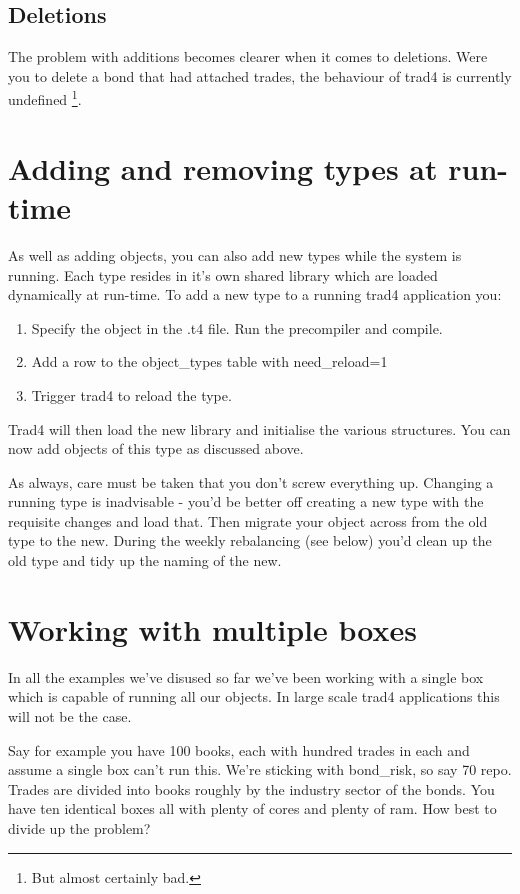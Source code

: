 \documentclass{report}
\begin{document}
\subsection{Deletions}

The problem with additions becomes clearer when it comes to deletions. Were you to delete a bond that had attached trades, the behaviour of trad4 is currently undefined \footnote{But almost certainly bad.}.

\section{Adding and removing types at run-time}

As well as adding objects, you can also add new types while the system is running. Each type resides in it's own shared library which are loaded dynamically at run-time. To add a new type to a running trad4 application you:

\begin{enumerate}
\item Specify the object in the .t4 file. Run the precompiler and compile.
\item Add a row to the object_types table with need_reload=1
\item Trigger trad4 to reload the type.
\end{enumerate}

Trad4 will then load the new library and initialise the various structures. You can now add objects of this type as discussed above.

As always, care must be taken that you don't screw everything up. Changing a running type is inadvisable - you'd be better off creating a new type with the requisite changes and load that. Then migrate your object across from the old type to the new. During the weekly rebalancing (see below) you'd clean up the old type and tidy up the naming of the new.

\section{Working with multiple boxes}

In all the examples we've disused so far we've been working with a single box which is capable of running  all our objects. In large scale trad4 applications this will not be the case.

Say for example you have 100 books, each with hundred trades in each and assume a single box can't run this. We're sticking with bond_risk, so say 70%
repo. Trades are divided into books roughly by the industry sector of the bonds. You have ten identical boxes all with plenty of cores and plenty of ram. How best to divide up the problem?
\end{document}
